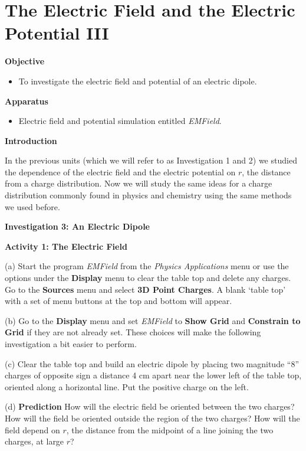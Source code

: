 
\section{The Electric Field and the Electric Potential III}

\makelabheader %

\textbf{Objective}

\begin{itemize}
\item To investigate the electric field and potential of an electric dipole.
\end{itemize}

\textbf{Apparatus}

\begin{itemize}
\item Electric field and potential simulation entitled {\it EMField}.
\end{itemize}

\textbf{Introduction}

In the previous units (which we will refer to as Investigation 1 and 2) we studied the dependence
of the electric field and the electric potential on $r$, the distance from
a charge distribution.
Now we will study the same ideas for a charge distribution commonly found in physics and chemistry
using the same methods we used before.

\textbf{Investigation 3: An Electric Dipole}

\textbf{Activity 1: The Electric Field}

(a) Start the program {\it EMField} from the {\it Physics Applications} menu or use the options under the 
\textbf{Display} menu to clear the table top and delete any charges.
Go to the \textbf{Sources} menu and select \textbf{3D Point Charges}.
A blank `table top' with a set of menu 
buttons at the top and bottom will appear.

(b) Go to the {\bf Display} menu and set {\it EMField} to
{\bf Show Grid} and {\bf Constrain to Grid} if they are not already set.
These choices will make the following investigation a bit easier to perform.

(c) Clear the table top and build an electric dipole by placing two magnitude
{}``8'' charges of opposite sign a distance 4 cm apart near the lower left 
of the table top, oriented along a horizontal line. Put the positive charge 
on the left.


(d) {\bf Prediction} How will the electric field be oriented between the two charges? How will the field be oriented outside the region of the two charges?
How will the field depend on $r$, the distance from the midpoint of a line joining the two charges, at large $r$?
\vspace{25mm}

